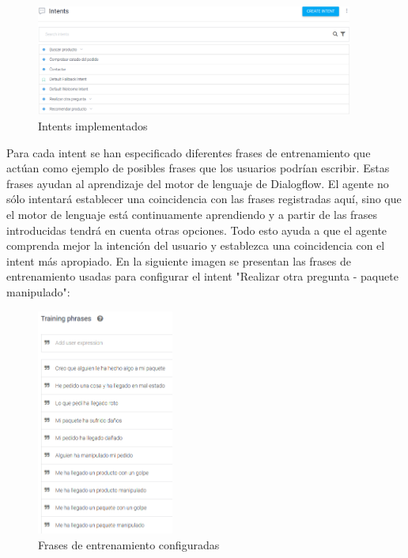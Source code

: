 \begin{figure}[ht]
	\begin{center}
		\includegraphics[width = 0.93\textwidth]{Figuras/intents.png}
	\end{center}
	\caption{\label{fig:intenciones} Intents implementados}
\end{figure}
\newpage


Para cada intent se han especificado diferentes frases de entrenamiento que actúan como ejemplo de posibles frases que los usuarios podrían escribir. Estas frases ayudan al aprendizaje del motor de lenguaje de Dialogflow. El agente no sólo intentará establecer una coincidencia con las frases registradas aquí, sino que el motor de lenguaje está continuamente aprendiendo y a partir de las frases introducidas tendrá en cuenta otras opciones. Todo esto ayuda a que el agente comprenda mejor la intención del usuario y establezca una coincidencia con el intent más apropiado. En la siguiente imagen se presentan las frases de entrenamiento usadas para configurar el intent "Realizar otra pregunta - paquete manipulado":

\begin{figure}[ht]
	\begin{center}
		\includegraphics[width = 0.40\textwidth]{Figuras/trainingPhrases.PNG}
	\end{center}
	\caption{\label{fig:frasesEntrenamiento} Frases de entrenamiento configuradas}
\end{figure}
\newpage

